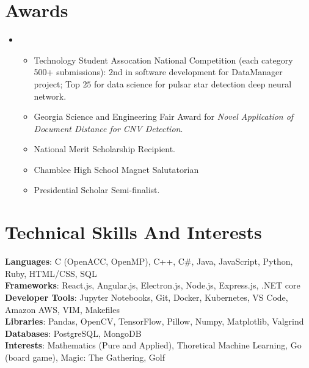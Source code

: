 \documentclass[letterpaper,10pt]{article}
\newcommand{\resumeItem}[1]{

  \item[$\circ$]\small{
    {#1 \vspace{-2pt}}
  }
}
\newcommand{\resumeItemListStart}{\begin{itemize}[rightmargin=1.9cm]}
\newcommand{\resumeItemListEnd}{\end{itemize}\vspace{-5pt}}
\begin{document}
\section{Awards}
\begin{itemize}[leftmargin=0.15in, label={}]
  \item{
              \resumeItemListStart
              \resumeItem{Technology Student Assocation National Competition (each category 500+ submissions): $2$nd in software development for DataManager project; Top $25$ for data science for pulsar star detection deep neural network.}
              \resumeItem{Georgia Science and Engineering Fair Award for \textit{Novel Application of Document Distance for CNV Detection}.}
              \resumeItem{National Merit Scholarship Recipient.}
              \resumeItem{Chamblee High School Magnet Salutatorian}
              \resumeItem{Presidential Scholar Semi-finalist.}
              \resumeItemListEnd

        }
  \vspace{3pt}

\end{itemize}
\section{Technical Skills And Interests}
\begin{itemize}[leftmargin=0.15in, label={}]
  \small{\item{
                \textbf{Languages}{: C (OpenACC, OpenMP), C++, C\#, Java, JavaScript, Python, Ruby, HTML/CSS, SQL}\\
                \textbf{Frameworks}{: React.js, Angular.js, Electron.js, Node.js, Express.js, .NET core} \\
                \textbf{Developer Tools}{: Jupyter Notebooks, Git, Docker, Kubernetes, VS Code, Amazon AWS, VIM, Makefiles} \\
                \textbf{Libraries}{: Pandas, OpenCV, TensorFlow, Pillow, Numpy, Matplotlib, Valgrind}\\
                \textbf{Databases}{: PostgreSQL, MongoDB}\\
                \textbf{Interests}{: Mathematics (Pure and Applied), Thoretical Machine Learning, Go (board game), Magic: The Gathering, Golf\\
                }}}
\end{itemize}
\end{document}
